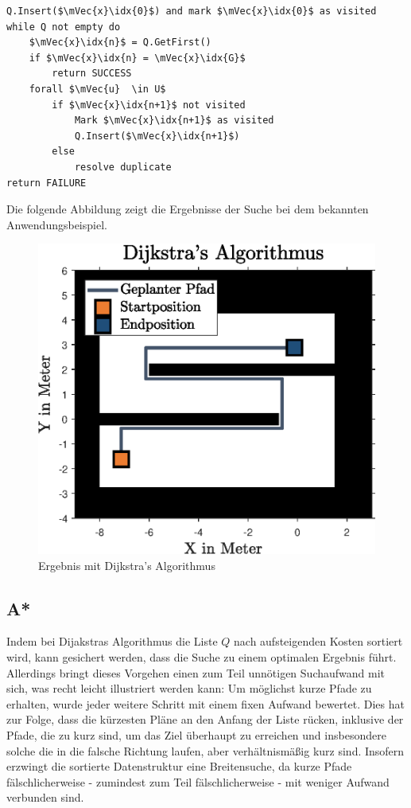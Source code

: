 \begin{lstlisting}[mathescape=true, caption={Dijkstra's Algorithmus in Pseudocode}]
Q.Insert($\mVec{x}\idx{0}$) and mark $\mVec{x}\idx{0}$ as visited
while Q not empty do
	$\mVec{x}\idx{n}$ = Q.GetFirst()
	if $\mVec{x}\idx{n} = \mVec{x}\idx{G}$
		return SUCCESS
	forall $\mVec{u}  \in U$
		if $\mVec{x}\idx{n+1}$ not visited
			Mark $\mVec{x}\idx{n+1}$ as visited
			Q.Insert($\mVec{x}\idx{n+1}$)
		else
			resolve duplicate
return FAILURE
\end{lstlisting}
Die folgende Abbildung zeigt die Ergebnisse der Suche bei dem bekannten Anwendungsbeispiel.
\begin{figure}[ht!]
\centering
\includegraphics[width=0.5\linewidth]{img/KorridorBeispiel_img6.eps}
\caption{Ergebnis mit Dijkstra's Algorithmus}
\end{figure}

\subsection{A*}
Indem bei Dijakstras Algorithmus die Liste $Q$ nach aufsteigenden Kosten sortiert wird, kann gesichert werden, dass die Suche zu einem optimalen Ergebnis führt. Allerdings bringt dieses Vorgehen einen zum Teil unnötigen Suchaufwand mit sich, was recht leicht illustriert werden kann: Um möglichst kurze Pfade zu erhalten, wurde jeder weitere Schritt mit einem fixen Aufwand bewertet. Dies hat zur Folge, dass die kürzesten Pläne an den Anfang der Liste rücken, inklusive der Pfade, die zu kurz sind, um das Ziel überhaupt zu erreichen und insbesondere solche die in die falsche Richtung laufen, aber verhältnismäßig kurz sind. Insofern erzwingt die sortierte Datenstruktur eine Breitensuche, da kurze Pfade fälschlicherweise - zumindest zum Teil fälschlicherweise - mit weniger Aufwand verbunden sind.

